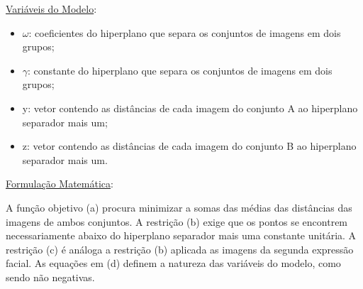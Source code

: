 \underline{Variáveis do Modelo}:
\begin{itemize}
\item{$\omega$}: coeficientes do hiperplano que separa os conjuntos de imagens em dois grupos;
\item{$\gamma$}: constante do hiperplano que separa os conjuntos de imagens em dois grupos;
\item{y}: vetor contendo as distâncias de cada imagem do conjunto A ao hiperplano separador mais um;
\item{z}: vetor contendo as distâncias de cada imagem do conjunto B ao hiperplano separador mais um.
\end{itemize}

\underline{Formulação Matemática}:

	A função objetivo (a) procura minimizar a somas das médias das distâncias das imagens de ambos conjuntos. A restrição (b) exige que os pontos se encontrem necessariamente abaixo do hiperplano separador mais uma constante unitária.  A restrição (c) é análoga a restrição (b) aplicada as imagens da segunda expressão facial. As equações em (d) definem a natureza das variáveis do modelo, como sendo não negativas.

